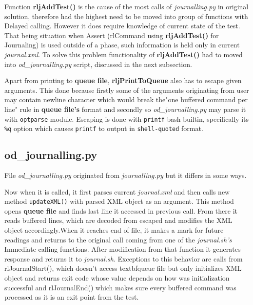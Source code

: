 Function \textbf{rljAddTest()} is the cause of the most calls of \textit{journalling.py} in original solution, therefore had the highest need to be moved into group of functions with Delayed calling. However it does require knowledge of current state of the test. That being situation when Assert (rlCommand using \textbf{rljAddTest()} for Journaling) is used outside of a phase, such information is held only in current \textit{journal.xml}. To solve this problem functionality of  \textbf{rljAddTest()} had to moved into \textit{{od\_journalling.py}} script, discussed in the next subsection.

Apart from printing to \textbf{queue file}, \textbf{rljPrintToQueue} also has to escape given arguments. This done because firstly some of the arguments originating from user may contain newline character which would break the"one buffered command per line" rule in  \textbf{queue file's} format and secondly so \textit{od\_journalling.py} may parse it with \texttt{optparse} module.
Escaping is done with \texttt{printf} bash builtin\cite{bash_builtins}, specifically its \texttt{\%q} option which causes \texttt{printf} to output in \texttt{shell-quoted} format.

\subsection{od\_journalling.py}
File \textit{od\_journalling.py} originated from \textit{journalling.py} but it differs in some ways.

Now when it is called, it first parses current \textit{journal.xml} and then calls new method \texttt{updateXML()} with parsed XML object as an argument. This method opens \textbf{queue file} and finds last line it accessed in previous call. From there it reads buffered lines, which are decoded from escaped and modifies the XML object accordingly.When it reaches end of file, it makes a mark for future readings and returns to the original call coming from one of the \textit{journal.sh's}  Immediate calling functions. After modification from that function it generates response and returns it to \textit{journal.sh}. Exceptions to this behavior are calls  from rlJournalStart(), which doesn't access textbf{queue file} but only initializes XML object and returns exit code whose value depends on how was initialization successful and rlJournalEnd() which makes sure every buffered command was processed as it is an exit point from the test.

